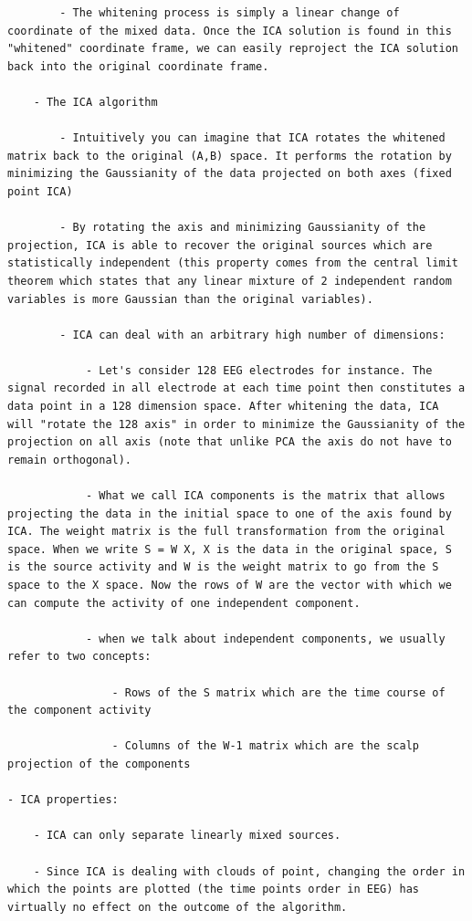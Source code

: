 \documentclass[
]{book}
\begin{document}
\begin{verbatim}
        - The whitening process is simply a linear change of coordinate of the mixed data. Once the ICA solution is found in this "whitened" coordinate frame, we can easily reproject the ICA solution back into the original coordinate frame.

    - The ICA algorithm

        - Intuitively you can imagine that ICA rotates the whitened matrix back to the original (A,B) space. It performs the rotation by minimizing the Gaussianity of the data projected on both axes (fixed point ICA)

        - By rotating the axis and minimizing Gaussianity of the projection, ICA is able to recover the original sources which are statistically independent (this property comes from the central limit theorem which states that any linear mixture of 2 independent random variables is more Gaussian than the original variables).

        - ICA can deal with an arbitrary high number of dimensions:

            - Let's consider 128 EEG electrodes for instance. The signal recorded in all electrode at each time point then constitutes a data point in a 128 dimension space. After whitening the data, ICA will "rotate the 128 axis" in order to minimize the Gaussianity of the projection on all axis (note that unlike PCA the axis do not have to remain orthogonal).

            - What we call ICA components is the matrix that allows projecting the data in the initial space to one of the axis found by ICA. The weight matrix is the full transformation from the original space. When we write S = W X, X is the data in the original space, S is the source activity and W is the weight matrix to go from the S space to the X space. Now the rows of W are the vector with which we can compute the activity of one independent component.

            - when we talk about independent components, we usually refer to two concepts:

                - Rows of the S matrix which are the time course of the component activity

                - Columns of the W-1 matrix which are the scalp projection of the components

- ICA properties:

    - ICA can only separate linearly mixed sources.

    - Since ICA is dealing with clouds of point, changing the order in which the points are plotted (the time points order in EEG) has virtually no effect on the outcome of the algorithm.


\end{verbatim}
\end{document}
